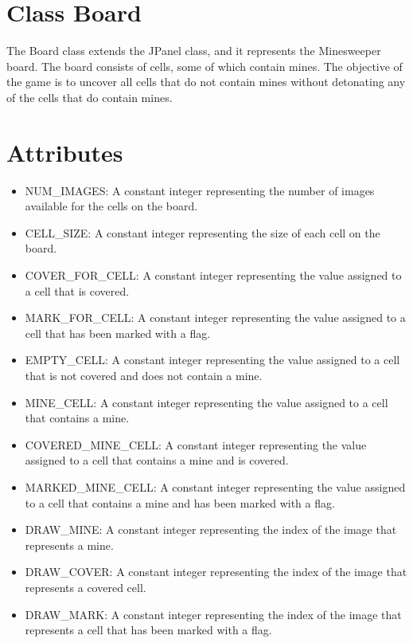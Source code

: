 \documentclass[
]{article}
\author{}
\date{}
\providecommand{\tightlist}{%
  \setlength{\itemsep}{0pt}\setlength{\parskip}{0pt}}
\begin{document}
\hypertarget{class-board}{%
\section{Class Board}\label{class-board}}

The Board class extends the JPanel class, and it represents the
Minesweeper board. The board consists of cells, some of which contain
mines. The objective of the game is to uncover all cells that do not
contain mines without detonating any of the cells that do contain mines.

\hypertarget{attributes}{%
\section{Attributes}\label{attributes}}

\begin{itemize}
\tightlist
\item
  NUM\_IMAGES: A constant integer representing the number of images
  available for the cells on the board.
\item
  CELL\_SIZE: A constant integer representing the size of each cell on
  the board.
\item
  COVER\_FOR\_CELL: A constant integer representing the value assigned
  to a cell that is covered.
\item
  MARK\_FOR\_CELL: A constant integer representing the value assigned to
  a cell that has been marked with a flag.
\item
  EMPTY\_CELL: A constant integer representing the value assigned to a
  cell that is not covered and does not contain a mine.
\item
  MINE\_CELL: A constant integer representing the value assigned to a
  cell that contains a mine.
\item
  COVERED\_MINE\_CELL: A constant integer representing the value
  assigned to a cell that contains a mine and is covered.
\item
  MARKED\_MINE\_CELL: A constant integer representing the value assigned
  to a cell that contains a mine and has been marked with a flag.
\item
  DRAW\_MINE: A constant integer representing the index of the image
  that represents a mine.
\item
  DRAW\_COVER: A constant integer representing the index of the image
  that represents a covered cell.
\item
  DRAW\_MARK: A constant integer representing the index of the image
  that represents a cell that has been marked with a flag.

\end{itemize}
\end{document}
